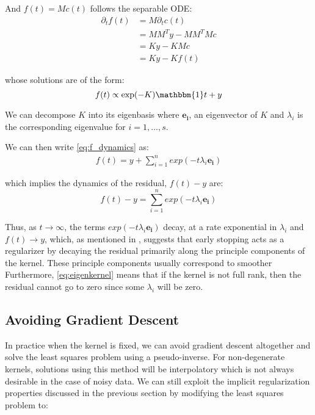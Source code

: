 And $f(t) = Mc(t)$ follows the separable ODE:
\begin{align}
    \partial_t f(t) &= M \partial_t c(t)\\
                    &= M M^T y - M M^T M c\\
                    &= K y - K Mc \\
                    &= K y - K f(t)
\end{align}

whose solutions are of the form:
\begin{equation}\label{eq:f_dynamics}
    f(t) \propto \exp(-K) \mathbbm{1} t + y
\end{equation}

We can decompose $K$ into its eigenbasis where $\mathbf{e_i}$, an eigenvector of $K$ and $\lambda_i$ is the corresponding eigenvalue for $i = 1, \ldots, s$. 

We can then write \eqref{eq:f_dynamics} as:
\begin{align}
    f(t) = y + \sum_{i=1}^n exp(-t \lambda_i \mathbf{e_i})
\end{align}

which implies the dynamics of the residual, $f(t) - y$ are:
\begin{equation}\label{eq:eigenkernel}
    f(t) - y = \sum_{i=1}^n exp(-t \lambda_i \mathbf{e_i})
\end{equation}

Thus, as $t \rightarrow \infty$, the terms $exp(-t \lambda_i\mathbf{e_i})$ decay, at a rate exponential in $\lambda_i$ and $f(t) \rightarrow y$, which, as mentioned in \cite{NTKJacot}, suggests that early stopping acts as a regularizer by decaying the residual primarily along the principle components of the kernel. These principle components usually correspond to smoother  Furthermore, \eqref{eq:eigenkernel} means that if the kernel is not full rank, then the residual cannot go to zero since some $\lambda_i$ will be zero.

\subsection{Avoiding Gradient Descent}

In practice when the kernel is fixed, we can avoid gradient descent altogether and solve the least squares problem using a pseudo-inverse. For non-degenerate kernels, solutions using this method will be interpolatory which is not always desirable in the case of noisy data. We can still exploit the implicit regularization properties discussed in the previous section by modifying the least squares problem to:

